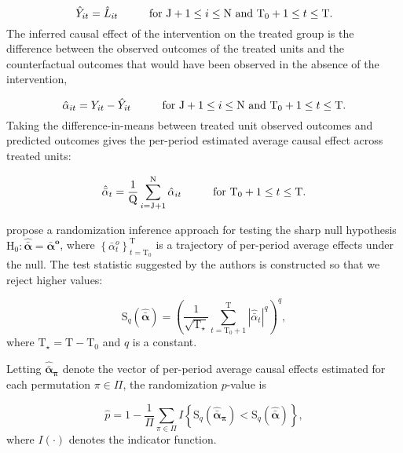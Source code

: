 \[
\hat{Y}_{it} = \hat{L}_{it} \hspace{10mm} \text{for } \text{J}+1 \leq i \leq \text{N} \text{ and } \text{T}_0+1 \leq t \leq \text{T}.
\] The inferred causal effect of the intervention on the treated group is the difference between the observed outcomes of the treated units and the counterfactual outcomes that would have been observed in the absence of the intervention, 

\[
\hat{\alpha}_{it} = Y_{it} - \hat{Y}_{it} \hspace{10mm} \text{for } \text{J}+1 \leq i \leq \text{N} \text{ and } \text{T}_0+1 \leq t \leq \text{T}.
\] Taking the difference-in-means between treated unit observed outcomes and predicted outcomes gives the per-period estimated average causal effect across treated units:

\begin{equation}
\hat{\bar{\alpha}}_{t}  = \frac{1}{\text{Q}} \sum^{\text{N}}_{i=\text{J}+1} \hat{\alpha}_{it} \hspace{10mm}  \text{for } \text{T}_0+1 \leq t \leq \text{T}.  \label{eq:avg-pointwise}
\end{equation}

\citet{chernozhukov2017exact} propose a randomization inference approach for testing the sharp null hypothesis $
\text{H}_0: \boldsymbol{\hat{\bar{\alpha}}} = \boldsymbol{\bar{\alpha}^{o}}$, where $\left\{\bar{\alpha}^{o}_{t}\right\}_{t= \text{T}_0}^\text{T}$ is a trajectory of per-period average effects under the null. The test statistic suggested by the authors is constructed so that we reject higher values:

\begin{equation} \label{tstat}
\text{S}_q (\boldsymbol{\hat{\bar{\alpha}}}) = \left(\frac{1}{\sqrt{\text{T}_\star}} \sum_{t= \text{T}_0 +1}^{\text{T}} |\hat{\bar{\alpha}}_{t}|^q\right)^q,
\end{equation}
%
where $\text{T}_\star = \text{T}- \text{T}_0$ and $q$ is a constant. 

Letting $\boldsymbol{\hat{\bar{\alpha}}_{\pi}}$ denote the vector of per-period average causal effects estimated for each permutation $\pi \in \Pi$, the randomization $p$-value is

\begin{equation}
\hat{p} = 1 - \frac{1}{\Pi} \sum_{\pi \in \Pi} I \left\{\text{S}_q (\boldsymbol{\hat{\bar{\alpha}}_{\pi}}) < \text{S}_q (\boldsymbol{\hat{\bar{\alpha}}}) \right\}, \label{eq:pvalue}
\end{equation}
%
where $I (\cdot)$ denotes the indicator function. 

